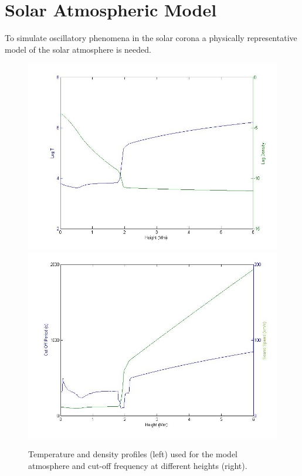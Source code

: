 \documentclass[preprint,authoryear,12pt]{elsarticle}
\begin{document}
\section{Solar Atmospheric Model}
To simulate oscillatory phenomena in the solar corona a physically representative model of the solar atmosphere is needed. 
\begin{figure}[h]
\begin{center}
\mbox{\includegraphics[scale=1]{imrescale/VAL3C_rho_temp_fig1L.jpg}}  
\mbox{\includegraphics[scale=1]{imrescale/soundspeedVAL3C_profile_fig1R.jpg}}
\par
\end{center}
\caption{Temperature and density profiles (left) used for the model atmosphere and cut-off frequency at different heights (right).}
\label{Fig1}
\end{figure}
\end{document}
